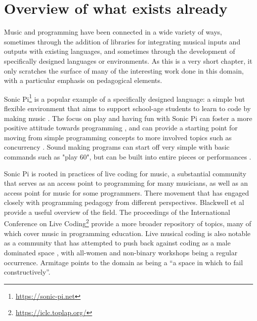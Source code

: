 \section{Overview of what exists already} \label{sec:literature}

Music and programming have been connected in a wide variety of ways, sometimes through the addition of libraries for integrating musical inputs and outputs with existing languages, and sometimes through the development of specifically designed languages or environments. As this is a very short chapter, it only scratches the surface of many of the interesting work done in this domain, with a particular emphasis on pedagogical elements.

Sonic Pi\footnote{\url{https://sonic-pi.net}} is a popular example of a specifically designed language: a simple but flexible environment that aims to support school-age students to learn to code by making music \cite{aaron_sonic_2016}. The focus on play and having fun with Sonic Pi can foster a more positive attitude towards programming \cite{petri_sonicpi_2022}, and can provide a starting point for moving from simple programming concepts to more involved topics such as concurrency \cite{traversaro_hearplay_2024}. Sound making programs can start off very simple with basic commands such as "play 60", but can be built into entire pieces or performances \cite{}. 

Sonic Pi is rooted in practices of live coding for music, a substantial community that serves as an access point to programming for many musicians, as well as an access point for music for some programmers. There  movement that has engaged closely with programming pedagogy from different perspectives. Blackwell et al \cite{blackwell_livecoding_2022} provide a useful overview of the field. The proceedings of the International Conference on Live Coding\footnote{\url{https://iclc.toplap.org/}} provide a more broader repository of topics, many of which cover music in programming education. Live musical coding is also notable as a community that has attempted to push back against coding as a male dominated space \cite{blackwell_livecoding_2022}, with all-women and non-binary workshops being a regular occurrence. Armitage \cite{armitage_spaces_2018} points to the domain as being a ``a space in which to fail constructively''.

